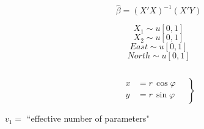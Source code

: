 \documentclass[14 pt]{article}
\begin{document}
\begin{equation}
\hat{\beta} = (X'X)^{-1}(X'Y)
\end{equation}

\begin{equation}
X_1 \sim u[0, 1]
\end{equation}
\begin{equation}
X_2 \sim u[0, 1]
\end{equation}
\begin{equation}
East \sim u[0, 1]
\end{equation}
\begin{equation}
North \sim u[0, 1]
\end{equation}

\begin{equation}
[Y, X_1, X_2, East, North]
\end{equation}

\begin{equation}
\left.
\begin{aligned}
    x &= r\,\cos \varphi \quad\\ %
    y &= r\,\sin \varphi
\end{aligned}
\right\}
\end{equation}

$v_1 =$ ``effective number of parameters" 
\end{document}
